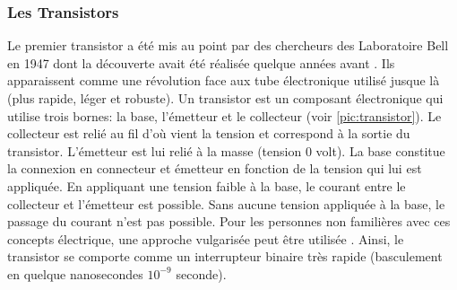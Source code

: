 \subsubsection{Les Transistors}
Le premier transistor a été mis au point par des chercheurs des Laboratoire Bell en 1947 \cite{bardeen1948transistor} dont la découverte avait été réalisée quelque années avant \cite{edgar1930method}. Ils apparaissent comme une révolution face aux tube électronique utilisé jusque là (plus rapide, léger et robuste). Un transistor est un composant électronique qui utilise trois bornes: la base, l'émetteur et le collecteur (voir \autoref{pic:transistor}). Le collecteur est relié au fil d'où vient la tension et correspond à la sortie du transistor. L'émetteur est lui relié à la masse (tension 0 volt). La base constitue la connexion en connecteur et émetteur en fonction de la tension qui lui est appliquée. En appliquant une tension faible à la base, le courant entre le collecteur et l'émetteur est possible. Sans aucune tension appliquée à la base, le passage du courant n'est pas possible. Pour les personnes non familières avec ces concepts électrique, une approche vulgarisée peut être utilisée \cite{JohnLeDuc2017}. Ainsi, le transistor se comporte comme un interrupteur binaire très rapide (basculement en quelque nanosecondes $10^{-9}$ seconde).




